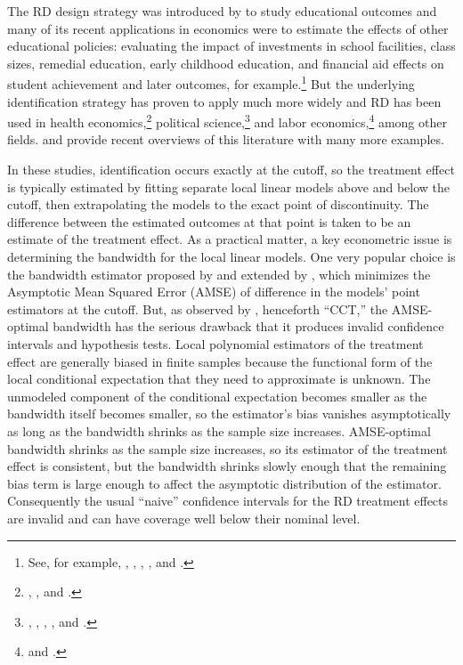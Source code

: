 \documentclass[12pt,fleqn]{article}
\begin{document}
The RD design strategy was introduced by \cite{thistlethwaite1960} to study
educational outcomes and many of its recent applications in economics were to
estimate the effects of other educational policies: evaluating the impact of
investments in school facilities, class sizes, remedial education, early
childhood education, and financial aid effects on student achievement and
later outcomes, for example.\footnote{%
  See, for example, \cite{vdk2002}, \cite{jacoblefgren2004},
  \cite{ludwig2007}, \cite{urquiola2009}, and \cite{cellini2010}.} %
But the underlying identification strategy has proven to apply much more
widely and RD has been used in health economics,\footnote{%
  \cite{Card2009}, \cite{barreca2011saving}, and \cite{KeeleEtAl}.} %
political science,\footnote{%
  \cite{lee2008}, \cite{caughey2011elections}, \cite{keele2014geographic},
  \cite{erikson2015}, and \cite{Fujiwara2011,Fujiwara2015}.} %
and labor economics,\footnote{%
  \cite{schmieder2012} and \cite{frandsen}.} %
among other fields. \cite{imbens2008} and \cite{lee2010} provide recent
overviews of this literature with many more examples.

In these studies, identification occurs exactly at the cutoff, so the
treatment effect is typically estimated by fitting separate local linear
models above and below the cutoff, then extrapolating the models to the exact
point of discontinuity. The difference between the estimated outcomes at that
point is taken to be an estimate of the treatment effect. As a practical
matter, a key econometric issue is determining the bandwidth for the local
linear models.  One very popular choice is the bandwidth estimator proposed by
\cite{IK} and extended by \cite{calonico2014}, which minimizes the Asymptotic
Mean Squared Error (AMSE) of difference in the models' point estimators at the
cutoff.  But, as observed by \cite{calonico2014}, henceforth ``CCT,''
the AMSE-optimal bandwidth has the serious drawback that it produces invalid
confidence intervals and hypothesis tests. Local polynomial estimators of the
treatment effect are generally biased in finite samples because the functional
form of the local conditional expectation that they need to approximate is unknown.
The unmodeled component of the conditional expectation becomes smaller as the
bandwidth itself becomes smaller, so the estimator's bias vanishes
asymptotically as long as the bandwidth shrinks as the sample size increases.
AMSE-optimal bandwidth shrinks as the sample size increases, so its estimator
of the treatment effect is consistent, but the bandwidth shrinks slowly enough
that the remaining bias term is large enough to affect the asymptotic
distribution of the estimator. Consequently the usual ``naive'' confidence
intervals for the RD treatment effects are invalid and can have coverage well
below their nominal level.
\end{document}

